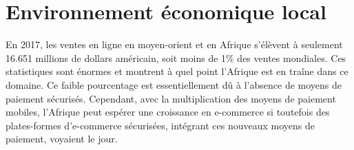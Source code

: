 \section{Environnement économique local}
En 2017, les ventes en ligne en moyen-orient et en Afrique s'élèvent à seulement 16.651 millions de dollars américain, soit moins de 1\% des ventes mondiales. Ces statistiques sont énormes et montrent à quel point l'Afrique est en traîne dans ce domaine. Ce faible pourcentage est essentiellement dû à l'absence de moyens de paiement sécurisés. Cependant, avec la multiplication des moyens de paiement mobiles, l'Afrique peut espérer une croissance en e-commerce si toutefois des plates-formes d'e-commerce sécurisées, intégrant ces nouveaux moyens de paiement, voyaient le jour.
